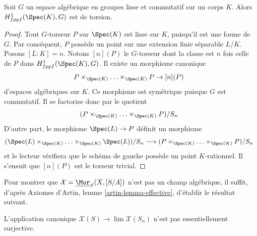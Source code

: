 \begin{lemma}
\label{lemma-torsors-over-field-torsion}
Soit $G$ un espace algébrique en groupes lisse et commutatif
sur un corps $K$. Alors $H^1_{fppf}(\Spec(K), G)$ est de torsion.
\end{lemma}

\begin{proof}
Tout $G$-torseur $P$ sur $\Spec(K)$ est lisse sur $K$, puisqu'il est une forme
de $G$. Par conséquent, $P$ possède un point sur une extension finie
séparable $L/K$. Posons $[L : K] = n$. Notons $[n](P)$ le $G$-torseur
dont la classe est $n$ fois celle de $P$ dans
$H^1_{fppf}(\Spec(K), G)$. Il existe un morphisme canonique
$$
P \times_{\Spec(K)} \ldots \times_{\Spec(K)} P \to [n](P)
$$
d'espaces algébriques sur $K$. Ce morphisme est symétrique puisque
$G$ est commutatif. Il se factorise donc par le quotient
$$
(P \times_{\Spec(K)} \ldots \times_{\Spec(K)} P)/S_n
$$
D'autre part, le morphisme $\Spec(L) \to P$ définit un morphisme
$$
(\Spec(L) \times_{\Spec(K)} \ldots \times_{\Spec(K)} \Spec(L))/S_n
\longrightarrow (P \times_{\Spec(K)} \ldots \times_{\Spec(K)} P)/S_n
$$
et le lecteur vérifiera que le schéma de gauche possède un point $K$-rationnel.
Il s'ensuit que $[n](P)$ est le torseur trivial.
\end{proof}

\noindent
Pour montrer que $\mathcal{X} = \underline{\Mor}_S(X, [S/A])$
n'est pas un champ algébrique, il suffit, d'après
Axiomes d'Artin, lemme \ref{artin-lemma-effective},
d'établir le résultat suivant.

\begin{lemma}
\label{lemma-not-essentially-surjective}
L'application canonique $\mathcal{X}(S) \to \lim \mathcal{X}(S_n)$ n'est pas
essentiellement surjective.
\end{lemma}

